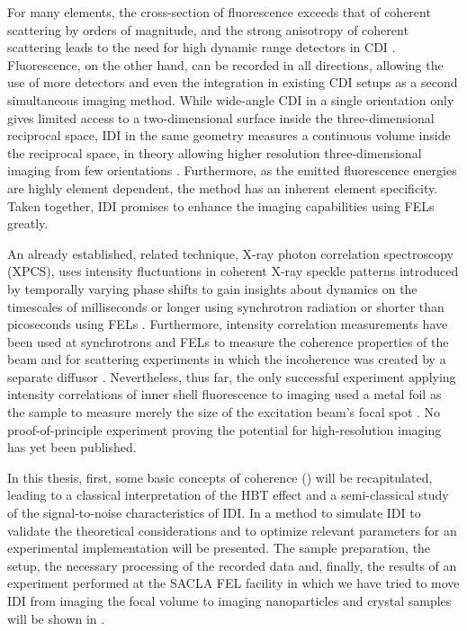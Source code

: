 For many elements, the cross-section of fluorescence exceeds that of coherent scattering by orders of magnitude, and the strong anisotropy of coherent scattering leads to the need for high dynamic range detectors in CDI \cite{xraylib,attwood1999}.  Fluorescence, on the other hand, can be recorded in all directions, allowing the use of more detectors and even the integration in existing CDI setups as a second simultaneous imaging method. While wide-angle CDI in a single orientation only gives limited access to a two-dimensional surface inside the  three-dimensional reciprocal space, IDI in the same geometry measures a continuous volume inside the reciprocal space, in theory allowing higher resolution three-dimensional imaging from few orientations \cite{barke2015,classen2017}. Furthermore, as the emitted fluorescence energies are highly element dependent, the method has an inherent element specificity. Taken together, IDI promises to enhance the imaging capabilities using FELs  greatly.

An already established, related technique, X-ray photon correlation spectroscopy (XPCS), uses intensity fluctuations in coherent X-ray speckle patterns introduced by temporally varying phase shifts to gain insights about dynamics on the timescales of milliseconds or longer using synchrotron radiation or shorter than picoseconds using FELs \cite{lehmkuhler2021,grubel2007}. Furthermore, intensity correlation measurements have been used at synchrotrons and FELs to measure the coherence properties of the beam and for scattering experiments in which the incoherence was created by a separate diffusor \cite{yabashi2002,singer2013,inoue2019,gorobtsov2018,schneider2018}.  Nevertheless, thus far, the only successful experiment applying intensity correlations of inner shell fluorescence to imaging used a metal foil as the sample to measure merely the size of the excitation beam's focal spot \cite{nakumura2020}. No proof-of-principle experiment proving the potential for high-resolution imaging has yet been published. 

In this thesis, first, some basic concepts of coherence () will be recapitulated, leading to a classical interpretation of the HBT effect and a semi-classical study of the signal-to-noise characteristics of IDI. In  a method to simulate IDI to validate the theoretical considerations and to optimize relevant parameters for an experimental implementation will be presented. The sample preparation, the setup, the necessary processing of the recorded data and, finally, the results of an experiment performed at the SACLA FEL facility in which we have tried to move IDI from imaging the focal volume to imaging nanoparticles and crystal samples will be shown in .

\cleardoublepage
